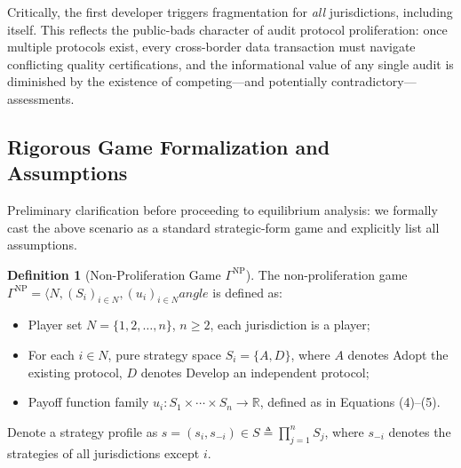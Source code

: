 \documentclass[12pt,a4paper]{ctexart}
\theoremstyle{definition}
\newtheorem{definition}{Definition}[section]
\theoremstyle{remark}
\begin{document}
Critically, the first developer triggers fragmentation for \textit{all} jurisdictions, including itself. This reflects the public-bads character of audit protocol proliferation: once multiple protocols exist, every cross-border data transaction must navigate conflicting quality certifications, and the informational value of any single audit is diminished by the existence of competing—and potentially contradictory—assessments.

\subsection{Rigorous Game Formalization and Assumptions}

Preliminary clarification before proceeding to equilibrium analysis: we formally cast the above scenario as a standard strategic-form game and explicitly list all assumptions.

\begin{definition}[Non-Proliferation Game $\Gamma^{\text{NP}}$]
The non-proliferation game $\Gamma^{\text{NP}} = \langle N, (S_i)_{i \in N}, (u_i)_{i \in N} 
angle$ is defined as:
\begin{itemize}
\item Player set $N = \{1, 2, \ldots, n\}$, $n \geq 2$, each jurisdiction is a player;
\item For each $i \in N$, pure strategy space $S_i = \{A, D\}$, where $A$ denotes Adopt the existing protocol, $D$ denotes Develop an independent protocol;
\item Payoff function family $u_i: S_1 \times \cdots \times S_n \to \mathbb{R}$, defined as in Equations (4)--(5).
\end{itemize}
Denote a strategy profile as $s = (s_i, s_{-i}) \in S \triangleq \prod_{j=1}^n S_j$, where $s_{-i}$ denotes the strategies of all jurisdictions except $i$.
\end{definition}
\end{document}
